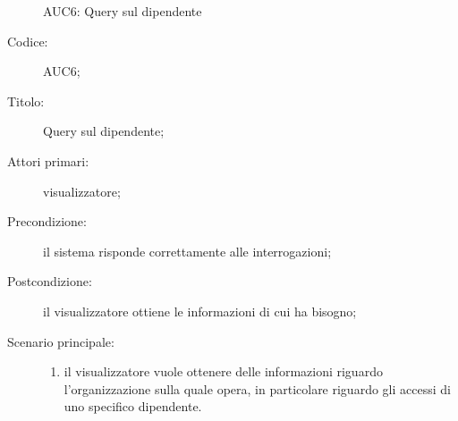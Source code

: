 \documentclass[../../../analisi-dei-requisiti.tex]{subfiles}
\begin{document}
\begin{figure}[H]
  \centering
  \caption{AUC6: Query sul dipendente}%
  \label{fig:AUC6}
\end{figure}

\begin{description}
  \item[Codice:] AUC6;
  \item[Titolo:] Query sul dipendente;
  \item[Attori primari:] visualizzatore;
  \item[Precondizione:] il sistema risponde correttamente alle interrogazioni;
  \item[Postcondizione:] il visualizzatore ottiene le informazioni di cui ha bisogno;
  \item[Scenario principale:]
  \begin{enumerate}
    \item il visualizzatore vuole ottenere delle informazioni riguardo l'organizzazione sulla quale opera, in particolare riguardo gli accessi di uno specifico dipendente.
  \end{enumerate}
\end{description}
\end{document}
